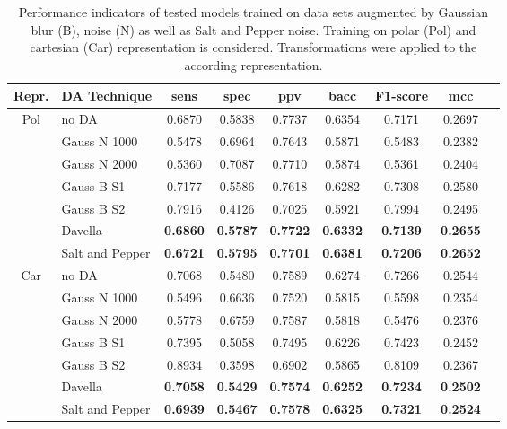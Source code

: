 \begin{table}[H]
    \centering
    \begin{tabular}{|c|l|c|c|c|c|c|c|c|}
        \hline
        Repr. & DA Technique & \acrshort{sens} & \acrshort{spec} & \acrshort{ppv} & \acrshort{bacc} & F1-score & \acrshort{mcc} \\\hline\hline
        \multirow{7}{2em}{Pol} & no DA & 0.6870 & 0.5838 & 0.7737 & 0.6354 & 0.7171 & 0.2697 \\
         & Gauss N 1000 & 0.5478 & 0.6964 & 0.7643 & 0.5871 & 0.5483 & 0.2382 \\
         & Gauss N 2000 & 0.5360 & 0.7087 & 0.7710 & 0.5874 & 0.5361 & 0.2404 \\
         & Gauss B S1 & 0.7177 & 0.5586 & 0.7618 & 0.6282 & 0.7308 & 0.2580 \\
         & Gauss B S2 & 0.7916 & 0.4126 & 0.7025 & 0.5921 & 0.7994 & 0.2495 \\
         & Davella & \textbf{0.6860} & \textbf{0.5787} & \textbf{0.7722} & \textbf{0.6332} & \textbf{0.7139} & \textbf{0.2655} \\
         & Salt and Pepper & \textbf{0.6721} & \textbf{0.5795} & \textbf{0.7701} & \textbf{0.6381} & \textbf{0.7206} & \textbf{0.2652} \\
        \hline
        \multirow{7}{2em}{Car} & no DA & 0.7068 & 0.5480 & 0.7589 & 0.6274 & 0.7266 & 0.2544 \\
         & Gauss N 1000 & 0.5496 & 0.6636 & 0.7520 & 0.5815 & 0.5598 & 0.2354 \\
         & Gauss N 2000 & 0.5778 & 0.6759 & 0.7587 & 0.5818 & 0.5476 & 0.2376 \\
         & Gauss B S1 & 0.7395 & 0.5058 & 0.7495 & 0.6226 & 0.7423 & 0.2452 \\
         & Gauss B S2 & 0.8934 & 0.3598 & 0.6902 & 0.5865 & 0.8109 & 0.2367 \\
         & Davella & \textbf{0.7058} & \textbf{0.5429} & \textbf{0.7574} & \textbf{0.6252} & \textbf{0.7234} & \textbf{0.2502} \\
         & Salt and Pepper & \textbf{0.6939} & \textbf{0.5467} & \textbf{0.7578} & \textbf{0.6325} & \textbf{0.7321} & \textbf{0.2524} \\
        \hline
    \end{tabular}
    \caption[Convolutional filters]{Performance indicators of tested models trained on data sets augmented by Gaussian blur (B), noise (N) as well as Salt and Pepper noise. Training on polar (Pol) and cartesian (Car) representation is considered. Transformations were applied to the according representation.}
    \label{tab:conv_filters}
\end{table}
